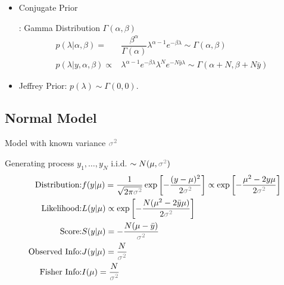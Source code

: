 \begin{itemize}[topsep=2pt,itemsep=0pt]
    \item \hypertarget{ExpConjugate}{Conjugate Prior}: Gamma Distribution $ \Gamma (\alpha ,\beta  ) $
    \begin{align}
        p(\lambda|\alpha ,\beta  )=&\dfrac{ \beta ^\alpha   }{ \Gamma (\alpha ) }\lambda ^{\alpha -1}e^{-\beta  \lambda }\sim \Gamma (\alpha ,\beta  )  \\
        p(\lambda |y,\alpha ,\beta )\propto&\lambda ^{\alpha -1}e^{-\beta  \lambda }\lambda ^{N}e^{-N\bar{y}\lambda }\sim \Gamma (\alpha +N, \beta +N\bar{y})
    \end{align}

    \item Jeffrey Prior: $ p(\lambda )\sim \Gamma (0 ,0) $. 
\end{itemize}

    



\subsection{Normal Model}\label{SubSubSectionBayesianNormal}
\begin{point}
    Model with known variance $ \fixed{\sigma ^2} $
\end{point}

Generating process $ y_1,\ldots,y_N $ i.i.d. $ \sim N(\mu ,\fixed{\sigma ^2}) $
\begin{align}
    \text{Distribution:}&f(y|\mu  )=\dfrac{1}{\sqrt{2\pi\fixed{\sigma^2}}}\exp\left[ -\dfrac{(y-\mu )^2}{2\fixed{\sigma ^2}} \right]\propto \exp\left[ -\dfrac{\mu ^2-2y\mu }{2\fixed{\sigma ^2}} \right]\\
    \text{Likelihood:}&L( y|\mu)\propto  \exp\left[ -\dfrac{N(\mu ^2-2\bar{y}\mu) }{2\fixed{\sigma ^2}} \right] \\
    \text{Score:}&S(y|\mu)= -\dfrac{N(\mu -\bar{y})}{\fixed{\sigma ^2}}\\
    \text{Observed Info:}&J(y|\mu)=\dfrac{N}{\fixed{\sigma ^2}}\\
    \text{Fisher Info:}&I(\mu  )=\dfrac{N}{\fixed{\sigma ^2} }
\end{align}


